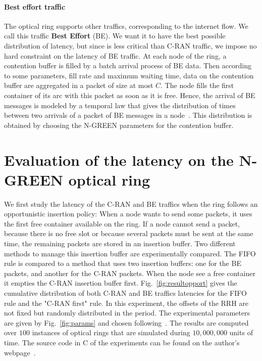 \documentclass[]{llncs}
\begin{document}
\paragraph{Best effort traffic}

The optical ring supports other traffics, corresponding to the internet flow. We call this traffic \textbf{Best Effort} (BE). We want it to have the best possible distribution of latency, but since is less critical than C-RAN traffic, we impose no hard constraint on the latency of BE traffic. At each node of the ring, a contention buffer is filled by a batch arrival process of BE data. Then according to some parameters, fill rate and maximum waiting time, data on the contention buffer are aggregated in a packet of size at most $C$. The node fills the first container of its arc with this packet as soon as it is free. Hence, the arrival of BE messages is modeled by a temporal law that gives the distribution of times between two arrivals of a packet of BE messages in a node~\cite{youssef2018}. This distribution is obtained by choosing the N-GREEN parameters for the contention buffer.

   \section{Evaluation of the latency on the N-GREEN optical ring}
   \label{sec:oportmethods}
   
   
  We first study the latency of the C-RAN and BE traffics when the ring follows an opportunistic insertion policy: When a node wants to send some packets, it uses the first free container available on the ring. 
  If a node cannot send a packet, because there is no free slot or because several packets must be sent at the same time, the remaining packets are stored in an insertion buffer. Two different methods to manage this insertion buffer are experimentally compared. The FIFO rule is compared to a method that uses two insertion buffers: one for the BE packets, and another for the C-RAN packets. When the node see a free container it empties the C-RAN insertion buffer first.  Fig.~\ref{fig:resultopport} gives the cumulative distribution of both C-RAN and BE traffics latencies for the FIFO rule and the "C-RAN first" rule. In this experiment, the offsets of the RRH are not fixed but randomly distributed in the period. The experimental parameters are given by Fig.~\ref{fig:params} and chosen following~\cite{ngreenarchitecture}. The results are computed over $100$ instances of optical rings that are simulated during $10,000,000$ units of time. The source code in C of the experiments can be found on the author's webpage~\cite{webpage}.
  
\end{document}
